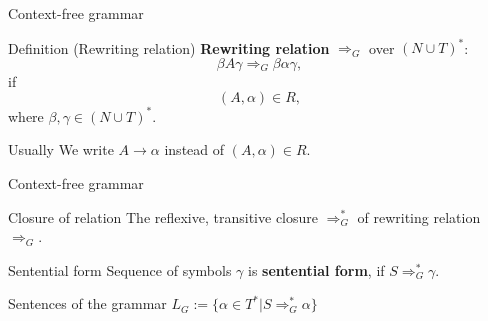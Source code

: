 \documentclass[t,usenames,dvipsnames]{beamer} %
\newcommand{\1}{\boldsymbol{1}}
\newcommand{\0}{\boldsymbol{0}}
\begin{document}
\begin{frame}{Context-free grammar}
\subtitle{Derivation tree}
\begin{block}{Definition (Rewriting relation)}
    \textbf{Rewriting relation} \( \Rightarrow_G \) over \( (N \cup T)^* \):
\[ \beta A \gamma \Rightarrow_G \beta \alpha \gamma, \]
if  \[ (A, \alpha) \in R, \]
where \( \beta, \gamma \in (N \cup T)^*. \)
\end{block}
\pause
\begin{block}{Usually}
     We write \(A \to \alpha\) instead of \((A, \alpha) \in R \).
\end{block}
\end{frame}


\begin{frame}{Context-free grammar}

\begin{block}{Closure of relation}
The reflexive, transitive closure \( \Rightarrow_G^* \) of rewriting relation \( \Rightarrow_G \).
\end{block}
\begin{block}{Sentential form}
Sequence of symbols $\gamma$ is \textbf{sentential form}, if \(S \Rightarrow_G^* \gamma\).
\end{block}
\begin{block}{Sentences of the grammar}
  \( L_G := \{\alpha \in T^* | S \Rightarrow_G^* \alpha \}\)
\end{block}
\end{frame}
\end{document}
